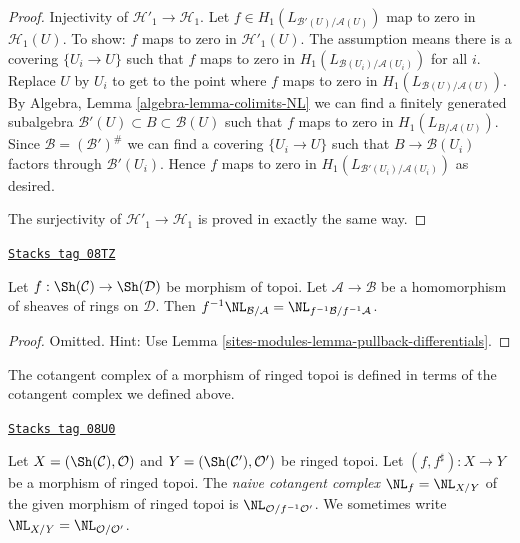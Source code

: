 \begin{proof}
\medskip\noindent
Injectivity of $\mathcal{H}'_1 \to \mathcal{H}_1$. Let
$f \in H_1(L_{\mathcal{B}'(U)/\mathcal{A}(U)})$ map to zero
in $\mathcal{H}_1(U)$. To show: $f$ maps to zero in
$\mathcal{H}'_1(U)$. The assumption means there is a covering
$\{U_i \to U\}$ such that $f$ maps to zero in
$H_1(L_{\mathcal{B}(U_i)/\mathcal{A}(U_i)})$ for all $i$.
Replace $U$ by $U_i$ to get to the point where $f$ maps to zero
in $H_1(L_{\mathcal{B}(U)/\mathcal{A}(U)})$.
By Algebra, Lemma \ref{algebra-lemma-colimits-NL}
we can find a finitely generated subalgebra
$\mathcal{B}'(U) \subset B \subset \mathcal{B}(U)$ such
that $f$ maps to zero in $H_1(L_{B/\mathcal{A}(U)})$.
Since $\mathcal{B} = (\mathcal{B}')^\#$ we can find a covering
$\{U_i \to U\}$ such that $B \to \mathcal{B}(U_i)$ factors
through $\mathcal{B}'(U_i)$. Hence $f$ maps to zero in
$H_1(L_{\mathcal{B}'(U_i)/\mathcal{A}(U_i)})$ as desired.

\medskip\noindent
The surjectivity of $\mathcal{H}'_1 \to \mathcal{H}_1$ is proved
in exactly the same way.
\end{proof}

\begin{lemma}[Pullback NL]
\label{sites-modules-lemma-pullback-NL}
\href{https://stacks.math.columbia.edu/tag/08TZ}{\texttt{Stacks tag 08TZ}}

Let $f : \Sh(\mathcal{C}) \to \Sh(\mathcal{D})$ be morphism of topoi.
Let $\mathcal{A} \to \mathcal{B}$ be a homomorphism of sheaves of rings
on $\mathcal{D}$. Then $f^{-1}\NL_{\mathcal{B}/\mathcal{A}} =
\NL_{f^{-1}\mathcal{B}/f^{-1}\mathcal{A}}$.
\end{lemma}

\begin{proof}
Omitted. Hint: Use Lemma \ref{sites-modules-lemma-pullback-differentials}.
\end{proof}

The cotangent complex of a morphism of ringed topoi is defined
in terms of the cotangent complex we defined above.

\begin{definition}
\label{sites-modules-definition-cotangent-complex-morphism-ringed-topoi}
\href{https://stacks.math.columbia.edu/tag/08U0}{\texttt{Stacks tag 08U0}}

Let $X = (\Sh(\mathcal{C}), \mathcal{O})$ and
$Y = (\Sh(\mathcal{C}'), \mathcal{O}')$ be ringed topoi.
Let $(f, f^\sharp) : X \to Y$ be a morphism of ringed topoi.
The {\it naive cotangent complex} $\NL_f = \NL_{X/Y}$
of the given morphism of ringed topoi is
$\NL_{\mathcal{O}/f^{-1}\mathcal{O}'}$.
We sometimes write $\NL_{X/Y} = \NL_{\mathcal{O}/\mathcal{O}'}$.
\end{definition}

